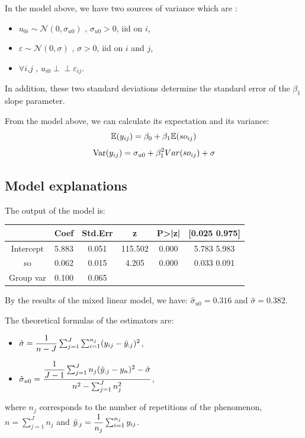\documentclass{article}
\begin{document}
In the model above, we have two sources of variance which are :
\begin{itemize}
    \item $u_{0i} \sim \mathcal{N}(0,\sigma_{u0}) \text{ , } \sigma_{u0}>0$, iid on $i$,
    \item $\varepsilon \sim \mathcal{N}(0, \sigma) \text{ , } \sigma >0$, iid on $i$ and $j$,
    \item $\forall i \text{,} j \text{ , } u_{i0} \perp \!\!\! \perp \varepsilon_{ij}$.
\end{itemize}

In addition, these two standard deviations determine the standard error of the $\beta_1$ slope parameter.

From the model above, we can calculate its expectation and its variance: 
$$\mathbb{E}(y_{ij})=\beta_0 + \beta_1 \mathbb{E}(so_{ij})$$
$$\operatorname{Var}(y_{ij})=\sigma_{u0} + \beta_1^2 Var(so_{ij}) + \sigma$$

\subsection{Model explanations}
The output of the model is:
\begin{center}
    \begin{tabular}{|c|c|c|c|c|c|}
    \hline
         & Coef & Std.Err & z & P>|z| &[0.025 0.975]  \\
         \hline \hline
        Intercept & 5.883 & 0.051 & 115.502 & 0.000 & 5.783 5.983\\
         so & 0.062 & 0.015 & 4.205 & 0.000 & 0.033 0.091 \\
         Group var &  0.100 & 0.065 &  & &  \\
         \hline
    \end{tabular}
\end{center}


By the results of the mixed linear model, we have:
$\hat{\sigma}_{u0}=0.316$ and $\hat{\sigma}=0.382$.

The theoretical formulas of the estimators are:
\begin{itemize}
    \item $\hat{\sigma}=\dfrac{1}{n-J} \sum_{j=1}^{J} \sum_{i=1}^{n_j} (y_{ij}-\Bar{y}_{:j})^2$,
    \item $\hat{\sigma}_{u0}=\dfrac{\dfrac{1}{J-1} \sum_{j=1}^J n_j(\Bar{y}_{:j}-y_n)^2 - \hat{\sigma}}{n^2 - \sum_{j=1}^J n_j^2}$,
\end{itemize}
where $n_j$ corresponds to the number of repetitions of the phenomenon, $n=\sum_{j=1}^J n_j$ and $\Bar{y}_{:j}=\dfrac{1}{n_j}\sum_{i=1}^{n_j} y_{ij}$.
\end{document}
